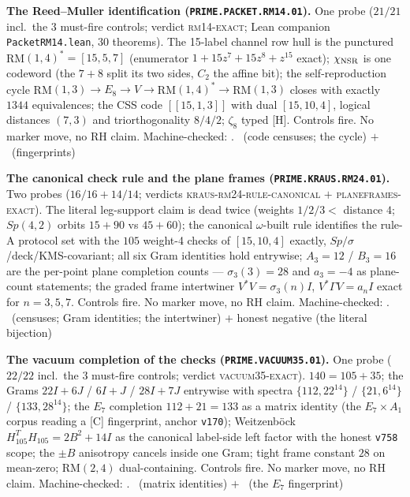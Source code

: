 \documentclass[11pt,a4paper]{article}
\theoremstyle{definition}
\begin{document}
\par\smallskip\noindent\textbf{The Reed--Muller identification
(\texttt{PRIME.PACKET.RM14.01}).}
One probe ($21/21$ incl.\ the $3$ must-fire controls; verdict
\textsc{rm14-exact}; Lean companion \texttt{PacketRM14.lean}, $30$
theorems).  The 15-label channel row hull is the punctured
RM$(1,4)^*=[15,5,7]$ (enumerator $1+15z^7+15z^8+z^{15}$ exact);
$\chi_{\rm NSR}$ is one codeword (the $7{+}8$ split its two sides,
$C_2$ the affine bit); the self-reproduction cycle
RM$(1,3)\to E_8\to V\to$RM$(1,4)^*\to$RM$(1,3)$ closes with
exactly $1344$ equivalences; the CSS code $[[15,1,3]]$ with dual
$[15,10,4]$, logical distances $(7,3)$ and triorthogonality
$8/4/2$; $\zeta_8$ typed [H].  Controls fire.  No marker move, no
RH claim.
Machine-checked: .
\mE\ (code censuses; the cycle) $+$ \mC\ (fingerprints)
\par\smallskip

\par\smallskip\noindent\textbf{The canonical check rule and the
plane frames (\texttt{PRIME.KRAUS.RM24.01}).}
Two probes ($16/16+14/14$; verdicts
\textsc{kraus-rm24-rule-canonical} $+$ \textsc{planeframes-exact}).
The literal leg-support claim is dead twice (weights $1/2/3<$
distance $4$; $Sp(4,2)$ orbits $15{+}90$ vs $45{+}60$); the
canonical $\omega$-built rule identifies the rule-A protocol set
with the $105$ weight-4 checks of $[15,10,4]$ exactly,
$Sp/\sigma$/deck/KMS-covariant; all six Gram identities hold
entrywise; $A_3=12$ / $B_3=16$ are the per-point plane completion
counts --- $\sigma_3(3)=28$ and $a_3=-4$ as plane-count
statements; the graded frame intertwiner $V^*V=\sigma_3(n)I$,
$V^*\Gamma V=a_nI$ exact for $n=3,5,7$.  Controls fire.  No
marker move, no RH claim.
Machine-checked: .
\mE\ (censuses; Gram identities; the intertwiner) $+$ honest
negative (the literal bijection)
\par\smallskip

\par\smallskip\noindent\textbf{The vacuum completion of the checks
(\texttt{PRIME.VACUUM35.01}).}
One probe ($22/22$ incl.\ the $3$ must-fire controls; verdict
\textsc{vacuum35-exact}).  $140=105+35$; the Grams $22I+6J$ /
$6I+J$ / $28I+7J$ entrywise with spectra $\{112,22^{14}\}$ /
$\{21,6^{14}\}$ / $\{133,28^{14}\}$; the $E_7$ completion
$112+21=133$ as a matrix identity (the $E_7\times A_1$ corpus
reading a [C] fingerprint, anchor \texttt{v170}); Weitzenb\"ock
$H_{105}^TH_{105}=2B^2+14I$ as the canonical label-side left
factor with the honest \texttt{v758} scope; the $\pm B$
anisotropy cancels inside one Gram; tight frame constant $28$ on
mean-zero; RM$(2,4)$ dual-containing.  Controls fire.  No marker
move, no RH claim.
Machine-checked: .
\mE\ (matrix identities) $+$ \mC\ (the $E_7$ fingerprint)
\par\smallskip
\end{document}
